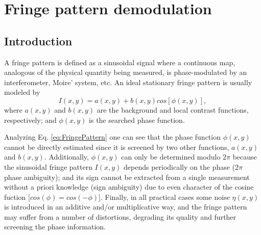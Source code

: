 \chapter{Fringe pattern demodulation}

\section{Introduction}

A fringe pattern is defined as a sinusoidal signal where a continuous map, 
analogous of the physical quantity being measured, is phase-modulated by an 
interferometer, Moire' system, etc. An ideal stationary fringe pattern is usually
modeled by
\begin{equation}
I(x,y)=a(x,y)+b(x,y)cos[\phi(x,y)],
\end{equation}\label{eq:FringePattern}
where $a(x,y)$ and $b(x,y)$ are the background and local contrast functions,
respectively; and $\phi(x,y)$ is the searched phase function.

Analyzing Eq. \ref{eq:FringePattern} one can see that the phase function
$\phi(x,y)$ cannot be directly estimated since it is screened by two other
functions, $a(x,y)$ and $b(x,y)$. Additionally, $\phi(x,y)$ can only be
determined modulo $2\pi$ because the sinusoidal fringe pattern $I(x,y)$ depends
periodically on the phase ($2\pi$ phase ambiguity); and its sign cannot be 
extracted from a single measurement without a priori knowledge (sign ambiguity)
due to even character of the cosine fuction [$cos(\phi)=cos(-\phi)$]. Finally, 
in all practical cases some noise $\eta(x,y)$ is introduced in an additive and/or
multiplicative way, and the fringe pattern may suffer from a number of distortions,
degrading its quality and further screening the phase information.




